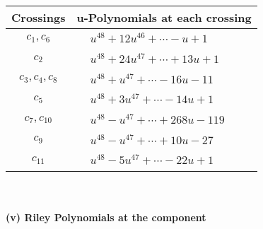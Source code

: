 \documentclass[1p]{elsarticle_modified}
\theoremstyle{definition}
\begin{document}
\begin{tabular}{m{50pt}|m{274pt}}
Crossings & \hspace{64pt}u-Polynomials at each crossing \\
\hline $$\begin{aligned}c_{1},c_{6}\end{aligned}$$&$\begin{aligned}
&u^{48}+12 u^{46}+\cdots- u+1
\end{aligned}$\\
\hline $$\begin{aligned}c_{2}\end{aligned}$$&$\begin{aligned}
&u^{48}+24 u^{47}+\cdots+13 u+1
\end{aligned}$\\
\hline $$\begin{aligned}c_{3},c_{4},c_{8}\end{aligned}$$&$\begin{aligned}
&u^{48}+u^{47}+\cdots-16 u-11
\end{aligned}$\\
\hline $$\begin{aligned}c_{5}\end{aligned}$$&$\begin{aligned}
&u^{48}+3 u^{47}+\cdots-14 u+1
\end{aligned}$\\
\hline $$\begin{aligned}c_{7},c_{10}\end{aligned}$$&$\begin{aligned}
&u^{48}- u^{47}+\cdots+268 u-119
\end{aligned}$\\
\hline $$\begin{aligned}c_{9}\end{aligned}$$&$\begin{aligned}
&u^{48}- u^{47}+\cdots+10 u-27
\end{aligned}$\\
\hline $$\begin{aligned}c_{11}\end{aligned}$$&$\begin{aligned}
&u^{48}-5 u^{47}+\cdots-22 u+1
\end{aligned}$\\
\hline
\end{tabular}\\~\\
\newpage\renewcommand{\arraystretch}{1}
\flushleft \textbf{(v) Riley Polynomials at the component}\newline \\
\end{document}
